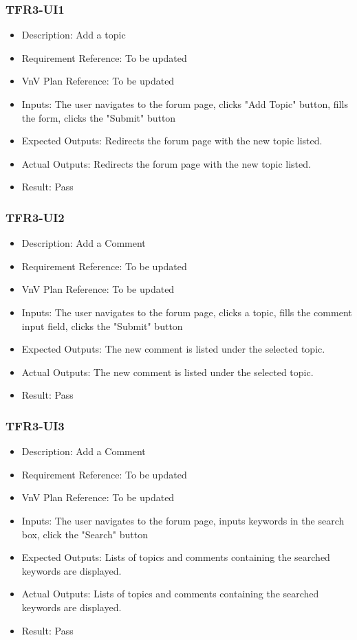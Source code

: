 \documentclass[12pt, titlepage]{article}
\begin{document}
\subsubsection{TFR3-UI1}\label{3.2.3}
\begin{itemize}
    \item Description: Add a topic
    \item Requirement Reference: To be updated
    \item VnV Plan Reference: To be updated
    \item Inputs: The user navigates to the forum page, clicks "Add Topic" button, fills the form, clicks the "Submit" button
    \item Expected Outputs: Redirects the forum page with the new topic listed.
    \item Actual Outputs: Redirects the forum page with the new topic listed.
    \item Result: Pass
\end{itemize}

\subsubsection{TFR3-UI2}\label{3.2.4}
\begin{itemize}
    \item Description: Add a Comment
    \item Requirement Reference: To be updated
    \item VnV Plan Reference: To be updated
    \item Inputs: The user navigates to the forum page, clicks a topic, fills the comment input field, clicks the "Submit" button
    \item Expected Outputs: The new comment is listed under the selected topic.
    \item Actual Outputs: The new comment is listed under the selected topic.
    \item Result: Pass
\end{itemize}

\subsubsection{TFR3-UI3}\label{3.2.5}
\begin{itemize}
    \item Description: Add a Comment
    \item Requirement Reference: To be updated
    \item VnV Plan Reference: To be updated
    \item Inputs: The user navigates to the forum page, inputs keywords in the search box, click the "Search" button
    \item Expected Outputs: Lists of topics and comments containing the searched keywords are displayed.
    \item Actual Outputs: Lists of topics and comments containing the searched keywords are displayed.
    \item Result: Pass
\end{itemize}
\end{document}
